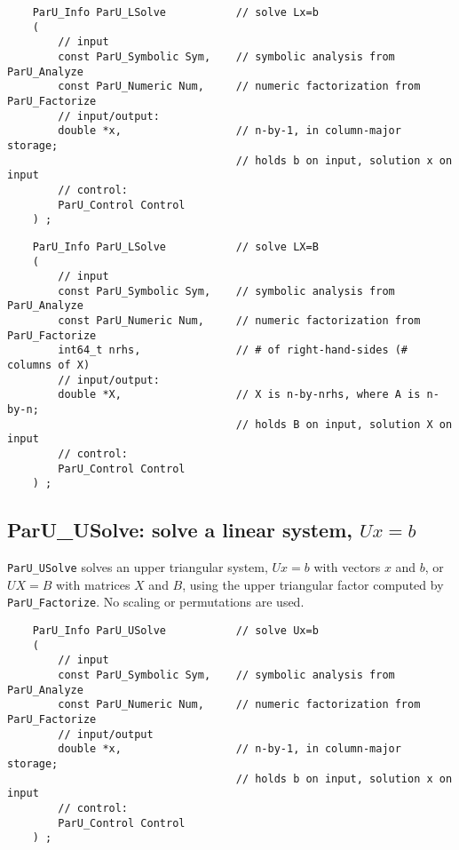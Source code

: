 \documentclass[12pt]{article}
\begin{document}
    {\footnotesize
    \begin{verbatim}
    ParU_Info ParU_LSolve           // solve Lx=b
    (
        // input
        const ParU_Symbolic Sym,    // symbolic analysis from ParU_Analyze
        const ParU_Numeric Num,     // numeric factorization from ParU_Factorize
        // input/output:
        double *x,                  // n-by-1, in column-major storage;
                                    // holds b on input, solution x on input
        // control:
        ParU_Control Control
    ) ; \end{verbatim} }

    {\footnotesize
    \begin{verbatim}
    ParU_Info ParU_LSolve           // solve LX=B
    (
        // input
        const ParU_Symbolic Sym,    // symbolic analysis from ParU_Analyze
        const ParU_Numeric Num,     // numeric factorization from ParU_Factorize
        int64_t nrhs,               // # of right-hand-sides (# columns of X)
        // input/output:
        double *X,                  // X is n-by-nrhs, where A is n-by-n;
                                    // holds B on input, solution X on input
        // control:
        ParU_Control Control
    ) ; \end{verbatim} }

\subsection{{\sf ParU\_USolve}: solve a linear system, $Ux=b$}

    \verb'ParU_USolve' solves an upper triangular system, $Ux=b$ with vectors
    $x$ and $b$, or $UX=B$ with matrices $X$ and $B$, using the upper
    triangular factor computed by \verb'ParU_Factorize'.  No scaling or
    permutations are used.

    {\footnotesize
    \begin{verbatim}
    ParU_Info ParU_USolve           // solve Ux=b
    (
        // input
        const ParU_Symbolic Sym,    // symbolic analysis from ParU_Analyze
        const ParU_Numeric Num,     // numeric factorization from ParU_Factorize
        // input/output
        double *x,                  // n-by-1, in column-major storage;
                                    // holds b on input, solution x on input
        // control:
        ParU_Control Control
    ) ; \end{verbatim} }
\end{document}
